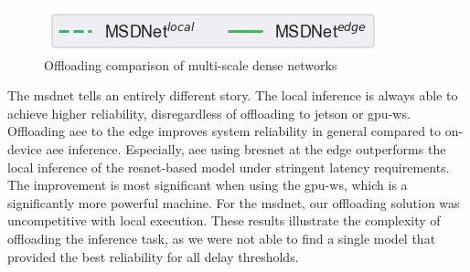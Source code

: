 \begin{figure}
	\captionsetup[subfigure]{justification=centering, farskip=0pt,captionskip=0pt}
	\centering
	\includegraphics[width=.3\linewidth]{figures/edge/gpu_msdnet_offloading_vs_local_legend}
	\hfill
	\hfill
	\caption[Offloading comparison of multi-scale dense networks]{Offloading comparison of multi-scale dense networks}
	\label{fig:msdnet-offloading-vs-local}
\end{figure}

The \gls{msdnet} tells an entirely different story. The local inference is always able to achieve higher reliability, disregardless of offloading to \gls{jetson} or \gls{gpu-ws}. 
Offloading \gls{aee} to the edge improves system reliability in general compared to on-device \gls{aee} inference. Especially, \gls{aee} using \gls{bresnet} at the edge outperforms the local inference of the \gls{resnet}-based model under stringent latency requirements. The improvement is most significant when using the \gls{gpu-ws}, which is a significantly more powerful machine. For the \gls{msdnet}, our offloading solution was uncompetitive with local execution. These results illustrate the complexity of offloading the inference task, as we were not able to find a single model that provided the best reliability for all delay thresholds.

